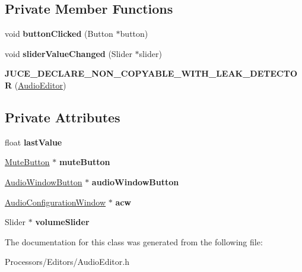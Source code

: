 \subsection*{Private Member Functions}
\begin{DoxyCompactItemize}
\item 
\hypertarget{classAudioEditor_a5449ebec2dabddad876dbbbd7f8fa424}{void {\bfseries button\-Clicked} (Button $\ast$button)}\label{classAudioEditor_a5449ebec2dabddad876dbbbd7f8fa424}

\item 
\hypertarget{classAudioEditor_af226bb0a6c971cd3454d75fa9aba29ca}{void {\bfseries slider\-Value\-Changed} (Slider $\ast$slider)}\label{classAudioEditor_af226bb0a6c971cd3454d75fa9aba29ca}

\item 
\hypertarget{classAudioEditor_a2fae9b7f8defa2e2f5d0f54c5505295f}{{\bfseries J\-U\-C\-E\-\_\-\-D\-E\-C\-L\-A\-R\-E\-\_\-\-N\-O\-N\-\_\-\-C\-O\-P\-Y\-A\-B\-L\-E\-\_\-\-W\-I\-T\-H\-\_\-\-L\-E\-A\-K\-\_\-\-D\-E\-T\-E\-C\-T\-O\-R} (\hyperlink{classAudioEditor}{Audio\-Editor})}\label{classAudioEditor_a2fae9b7f8defa2e2f5d0f54c5505295f}

\end{DoxyCompactItemize}
\subsection*{Private Attributes}
\begin{DoxyCompactItemize}
\item 
\hypertarget{classAudioEditor_abf448cf9e86bb877cae8fc45341e9b34}{float {\bfseries last\-Value}}\label{classAudioEditor_abf448cf9e86bb877cae8fc45341e9b34}

\item 
\hypertarget{classAudioEditor_a61fba4d0fe0c10fb251a895e0bd7416c}{\hyperlink{classMuteButton}{Mute\-Button} $\ast$ {\bfseries mute\-Button}}\label{classAudioEditor_a61fba4d0fe0c10fb251a895e0bd7416c}

\item 
\hypertarget{classAudioEditor_aa49403b405b8eaa56118f4464a9a18cb}{\hyperlink{classAudioWindowButton}{Audio\-Window\-Button} $\ast$ {\bfseries audio\-Window\-Button}}\label{classAudioEditor_aa49403b405b8eaa56118f4464a9a18cb}

\item 
\hypertarget{classAudioEditor_a54bb47012b71f96a69d5acbe91e992cd}{\hyperlink{classAudioConfigurationWindow}{Audio\-Configuration\-Window} $\ast$ {\bfseries acw}}\label{classAudioEditor_a54bb47012b71f96a69d5acbe91e992cd}

\item 
\hypertarget{classAudioEditor_a19b1e6de95cdd4da935ab9e5cfcce006}{Slider $\ast$ {\bfseries volume\-Slider}}\label{classAudioEditor_a19b1e6de95cdd4da935ab9e5cfcce006}

\end{DoxyCompactItemize}


The documentation for this class was generated from the following file\-:\begin{DoxyCompactItemize}
\item 
Processors/\-Editors/Audio\-Editor.\-h\end{DoxyCompactItemize}
